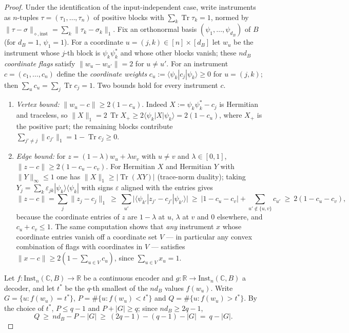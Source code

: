 \documentclass[11pt,a4paper]{article}
\newcommand{\Inst}{\mathrm{Inst}}
\newcommand{\Tr}{\operatorname{Tr}}
\begin{document}
\begin{proof}
Under the identification of the input-independent case, write instruments as $n$-tuples
$\tau=(\tau_1,\dots,\tau_n)$ of positive blocks with $\sum_k\Tr\tau_k=1$, normed by
$\|\tau-\sigma\|_{\diamond,\mathrm{inst}}=\sum_k\|\tau_k-\sigma_k\|_1$. Fix an
orthonormal basis $(\psi_1,\dots,\psi_{d_B})$ of $B$ (for $d_B=1$, $\psi_1=1$). For a
coordinate $u=(j,k)\in[n]\times[d_B]$ let $w_u$ be the instrument whose $j$-th block is
$\psi_k\psi_k^*$ and whose other blocks vanish; these $nd_B$ \emph{coordinate flags}
satisfy $\|w_u-w_{u'}\|=2$ for $u\ne u'$. For an instrument $c=(c_1,\dots,c_n)$ define
the \emph{coordinate weights} $c_u:=\langle\psi_k|c_j|\psi_k\rangle\ge0$ for
$u=(j,k)$; then $\sum_uc_u=\sum_j\Tr c_j=1$. Two bounds hold for every instrument $c$.
\begin{enumerate}[leftmargin=*,itemsep=2pt]
\item \emph{Vertex bound:} $\|w_u-c\|\ge2(1-c_u)$. Indeed
$X:=\psi_k\psi_k^*-c_j$ is Hermitian and traceless, so
$\|X\|_1=2\,\Tr X_+\ge2\langle\psi_k|X|\psi_k\rangle=2(1-c_u)$, where $X_+$ is the
positive part; the remaining blocks contribute
$\sum_{j'\ne j}\|c_{j'}\|_1=1-\Tr c_j\ge0$.
\item \emph{Edge bound:} for $z=(1-\lambda)w_u+\lambda w_v$ with $u\ne v$ and
$\lambda\in[0,1]$, $\|z-c\|\ge2(1-c_u-c_v)$. For Hermitian $X$ and Hermitian $Y$ with
$\|Y\|_\infty\le1$ one has $\|X\|_1\ge|\Tr(XY)|$ (trace-norm duality); taking
$Y_j=\sum_k\varepsilon_{jk}|\psi_k\rangle\langle\psi_k|$ with signs $\varepsilon$
aligned with the entries gives
\[
\|z-c\|=\sum_j\|z_j-c_j\|_1\ \ge\
\sum_{u'}\big|\langle\psi_{k'}|z_{j'}-c_{j'}|\psi_{k'}\rangle\big|
\ \ge\ \big|1-c_u-c_v\big|+\sum_{u'\notin\{u,v\}}c_{u'}\ \ge\ 2(1-c_u-c_v),
\]
because the coordinate entries of $z$ are $1-\lambda$ at $u$, $\lambda$ at $v$ and $0$
elsewhere, and $c_u+c_v\le1$. The same computation shows that \emph{any} instrument
$x$ whose coordinate entries vanish off a coordinate set $V$ --- in particular any
convex combination of flags with coordinates in $V$ --- satisfies
$\|x-c\|\ge2(1-\sum_{u\in V}c_u)$, since $\sum_{u\in V}x_u=1$.
\end{enumerate}
Let $f:\Inst_n(\mathbb C,B)\to\mathbb R$ be a continuous encoder and
$g:\mathbb R\to\Inst_n(\mathbb C,B)$ a decoder, and let $t^\ast$ be the $q$-th smallest
of the $nd_B$ values $f(w_u)$. Write $G=\{u:f(w_u)=t^\ast\}$,
$P=\#\{u:f(w_u)<t^\ast\}$ and $Q=\#\{u:f(w_u)>t^\ast\}$. By the choice of $t^\ast$,
$P\le q-1$ and $P+|G|\ge q$; since $nd_B\ge2q-1$,
\[
Q\ \ge\ nd_B-P-|G|\ \ge\ (2q-1)-(q-1)-|G|\ =\ q-|G|.
\]
\end{proof}
\end{document}
